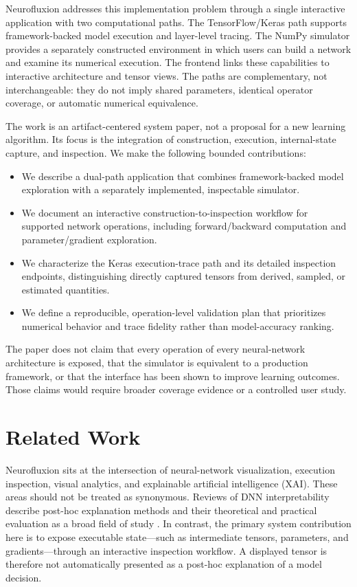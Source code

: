 \documentclass[conference]{IEEEtran}
\begin{document}
Neurofluxion addresses this implementation problem through a single interactive application with two computational paths. The TensorFlow/Keras path supports framework-backed model execution and layer-level tracing. The NumPy simulator provides a separately constructed environment in which users can build a network and examine its numerical execution. The frontend links these capabilities to interactive architecture and tensor views. The paths are complementary, not interchangeable: they do not imply shared parameters, identical operator coverage, or automatic numerical equivalence.

The work is an artifact-centered system paper, not a proposal for a new learning algorithm. Its focus is the integration of construction, execution, internal-state capture, and inspection. We make the following bounded contributions:
\begin{itemize}
  \item We describe a dual-path application that combines framework-backed model exploration with a separately implemented, inspectable simulator.
  \item We document an interactive construction-to-inspection workflow for supported network operations, including forward/backward computation and parameter/gradient exploration.
  \item We characterize the Keras execution-trace path and its detailed inspection endpoints, distinguishing directly captured tensors from derived, sampled, or estimated quantities.
  \item We define a reproducible, operation-level validation plan that prioritizes numerical behavior and trace fidelity rather than model-accuracy ranking.
\end{itemize}

The paper does not claim that every operation of every neural-network architecture is exposed, that the simulator is equivalent to a production framework, or that the interface has been shown to improve learning outcomes. Those claims would require broader coverage evidence or a controlled user study.

\section{Related Work}
Neurofluxion sits at the intersection of neural-network visualization, execution inspection, visual analytics, and explainable artificial intelligence (XAI). These areas should not be treated as synonymous. Reviews of DNN interpretability describe post-hoc explanation methods and their theoretical and practical evaluation as a broad field of study \cite{samek2021,ali2023,antamis2024,mohamed2025}. In contrast, the primary system contribution here is to expose executable state—such as intermediate tensors, parameters, and gradients—through an interactive inspection workflow. A displayed tensor is therefore not automatically presented as a post-hoc explanation of a model decision.
\end{document}
